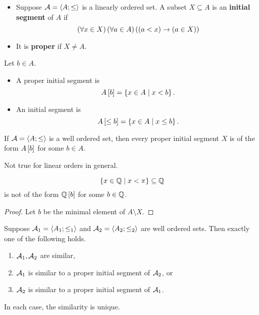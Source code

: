 \begin{definition}
\hfill
\begin{itemize}
\item Suppose $ \AA = \ab{A; \le} $ is a linearly ordered set. A subset $ X \subseteq A $ is an \textbf{initial segment} of $ A $ if
$$ \fab{x \in X}\fab{a \in A}\impb{\ltb{a}{x}}{\inb{a}{X}} $$
\item It is \textbf{proper} if $ X \ne A $.
\end{itemize}
\end{definition}

\begin{example*}
Let $ b \in A $.
\begin{itemize}
\item A proper initial segment is
$$ A\sb{b} = \cb{x \in A \mid x < b}. $$
\item An initial segment is
$$ A\sb{\le b} = \cb{x \in A \mid x \le b}. $$
\end{itemize}
\end{example*}

\begin{lemma}
\label{lem:3.3.6}
If $ \AA = \ab{A; \le} $ is a well ordered set, then every proper initial segment $ X $ is of the form $ A\sb{b} $ for some $ b \in A $.
\end{lemma}

\begin{remark*}
Not true for linear orders in general.
\end{remark*}

\begin{example*}
$$ \cb{x \in \Q \mid x < \pi} \subseteq \Q $$
is not of the form $ \Q\sb{b} $ for some $ b \in \Q $.
\end{example*}

\begin{proof}
Let $ b $ be the minimal element of $ A \setminus X $.
\end{proof}

\begin{theorem}
\label{thm:3.3.7}
Suppose $ \AA_1 = \ab{A_1; \le_1} $ and $ \AA_2 = \ab{A_2; \le_2} $ are well ordered sets. Then exactly one of the following holds.
\begin{enumerate}
\item $ \AA_1, \AA_2 $ are similar,
\item $ \AA_1 $ is similar to a proper initial segment of $ \AA_2 $, or
\item $ \AA_2 $ is similar to a proper initial segment of $ \AA_1 $.
\end{enumerate}
In each case, the similarity is unique.
\end{theorem}

